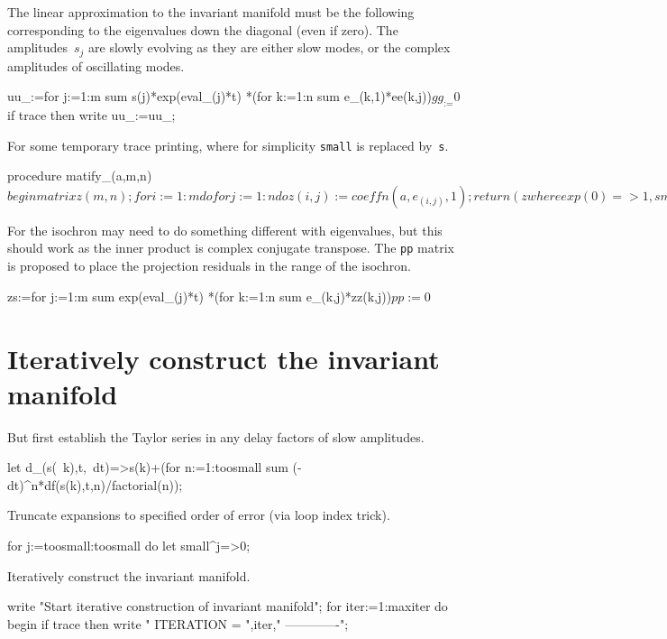 \documentclass[11pt,a5paper]{article}
\begin{document}
The linear approximation to the invariant manifold must be
the following corresponding to the eigenvalues down the
diagonal (even if zero). The amplitudes~$s_j$ are slowly
evolving as they are either slow modes, or the complex
amplitudes of oscillating modes.
\begin{reduce}
uu_:=for j:=1:m sum s(j)*exp(eval_(j)*t)
  *(for k:=1:n sum e_(k,1)*ee(k,j))$
gg_:=0$
if trace then write uu_:=uu_;
\end{reduce}

For some temporary trace printing, where for simplicity
\verb|small| is replaced by~\verb|s|.
\begin{reduce}
procedure matify_(a,m,n)$
  begin matrix z(m,n);
    for i:=1:m do for j:=1:n do z(i,j):=coeffn(a,e_(i,j),1);
    return (z where {exp(0)=>1,small=>s}); 
    end$
\end{reduce}

For the isochron may need to do something different with
eigenvalues, but this should work as the inner product is
complex conjugate transpose. The \verb|pp| matrix is
proposed to place the projection residuals in the range of
the isochron. 
\begin{reduce}
zs:=for j:=1:m sum exp(eval_(j)*t)
  *(for k:=1:n sum e_(k,j)*zz(k,j))$
pp:=0$
\end{reduce}




\section{Iteratively construct the invariant manifold}

But first establish the Taylor series in any delay factors
of slow amplitudes.
\begin{reduce}
let d_(s(~k),t,~dt)=>s(k)+(for n:=1:toosmall sum 
        (-dt)^n*df(s(k),t,n)/factorial(n));
\end{reduce}

Truncate expansions to specified order of error (via loop
index trick).
\begin{reduce}
for j:=toosmall:toosmall do let small^j=>0;
\end{reduce}

Iteratively construct the invariant manifold.
\begin{reduce}
write "Start iterative construction of invariant manifold";
for iter:=1:maxiter do begin
if trace then write "
ITERATION = ",iter,"
-------------";
\end{reduce}
\end{document}
